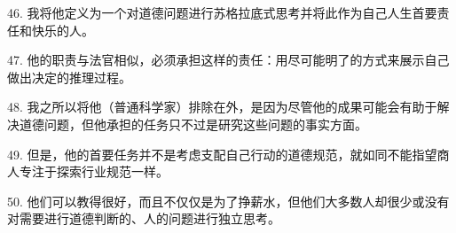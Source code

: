 46. 我将他定义为一个对道德问题进行苏格拉底式思考并将此作为自己人生首要责任和快乐的人。

47. 他的职责与法官相似，必须承担这样的责任：用尽可能明了的方式来展示自己做出决定的推理过程。

48. 我之所以将他（普通科学家）排除在外，是因为尽管他的成果可能会有助于解决道德问题，但他承担的任务只不过是研究这些问题的事实方面。

49. 但是，他的首要任务并不是考虑支配自己行动的道德规范，就如同不能指望商人专注于探索行业规范一样。

50. 他们可以教得很好，而且不仅仅是为了挣薪水，但他们大多数人却很少或没有对需要进行道德判断的、人的问题进行独立思考。
